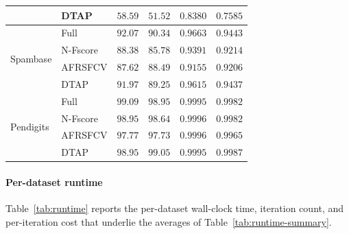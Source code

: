 \documentclass[]{interact}
\theoremstyle{plain}
\theoremstyle{definition}
\theoremstyle{remark}
\begin{document}
{\begin{longtable}{ll rr rr}
                              & DTAP     & $58.59$          & $\mathbf{51.52}$ & $\mathbf{0.8380}$ & $0.7585$          \\
\midrule
\multirow{4}{*}{Spambase}     & Full     & $92.07$          & $90.34$          & $0.9663$          & $0.9443$          \\*
                              & N-Fscore & $88.38$          & $85.78$          & $0.9391$          & $0.9214$          \\*
                              & AFRSFCV  & $87.62$          & $88.49$          & $0.9155$          & $0.9206$          \\*
                              & DTAP     & $\mathbf{91.97}$ & $\mathbf{89.25}$ & $\mathbf{0.9615}$ & $\mathbf{0.9437}$ \\
\midrule
\multirow{4}{*}{Pendigits}    & Full     & $99.09$          & $98.95$          & $0.9995$          & $0.9982$          \\*
                              & N-Fscore & $\mathbf{98.95}$ & $98.64$          & $\mathbf{0.9996}$ & $0.9982$          \\*
                              & AFRSFCV  & $97.77$          & $97.73$          & $\mathbf{0.9996}$ & $0.9965$          \\*
                              & DTAP     & $\mathbf{98.95}$ & $\mathbf{99.05}$ & $0.9995$          & $\mathbf{0.9987}$ \\
\end{longtable}
}

\paragraph*{Per-dataset runtime}
Table~\ref{tab:runtime} reports the per-dataset wall-clock time, iteration count, and per-iteration cost that underlie the averages of Table~\ref{tab:runtime-summary}.
\end{document}
